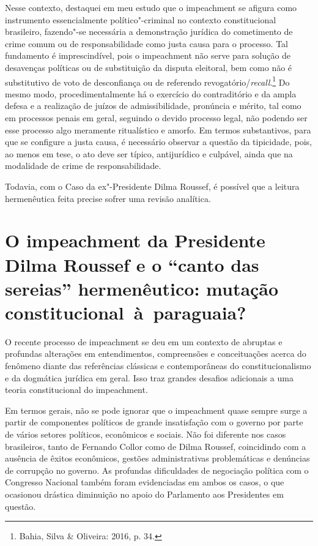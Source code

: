 Nesse contexto, destaquei em meu estudo que o impeachment se
afigura como instrumento essencialmente político"-criminal no contexto
constitucional brasileiro, fazendo"-se necessária a demonstração jurídica
do cometimento de crime comum ou de responsabilidade como justa causa
para o processo. Tal fundamento é imprescindível, pois o
impeachment não serve para solução de desavenças políticas ou de
substituição da disputa eleitoral, bem como não é substitutivo de voto
de desconfiança ou de referendo revogatório/\emph{recall}.\footnote{Bahia, Silva
\& Oliveira: 2016, p. 34.} Do mesmo modo, procedimentalmente há o
exercício do contraditório e da ampla defesa e a realização de juízos de
admissibilidade, pronúncia e mérito, tal como em processos penais em
geral, seguindo o devido processo legal, não podendo ser esse processo
algo meramente ritualístico e amorfo. Em termos substantivos, para que
se configure a justa causa, é necessário observar a questão da
tipicidade, pois, ao menos em tese, o ato deve ser típico, antijurídico
e culpável, ainda que na modalidade de crime de responsabilidade.

Todavia, com o Caso da ex"-Presidente Dilma Roussef, é possível que a
leitura hermenêutica feita precise sofrer uma revisão analítica.

\section{O impeachment da Presidente Dilma Roussef e o ``canto
  das sereias'' hermenêutico: mutação constitucional~à~paraguaia?}


O recente processo de impeachment se deu em um contexto de
abruptas e profundas alterações em entendimentos, compreensões e
conceituações acerca do fenômeno diante das referências clássicas e
contemporâneas do constitucionalismo e da dogmática jurídica em geral.
Isso traz grandes desafios adicionais a uma teoria constitucional do
impeachment.

Em termos gerais, não se pode ignorar que o impeachment quase
sempre surge a partir de componentes políticos de grande insatisfação
com o governo por parte de vários setores políticos, econômicos e
sociais. Não foi diferente nos casos brasileiros, tanto de Fernando
Collor como de Dilma Roussef, coincidindo com a ausência de êxitos
econômicos, gestões administrativas problemáticas e denúncias de
corrupção no governo. As profundas dificuldades de negociação política
com o Congresso Nacional também foram evidenciadas em ambos os casos, o
que ocasionou drástica diminuição no apoio do Parlamento aos Presidentes
em questão.

